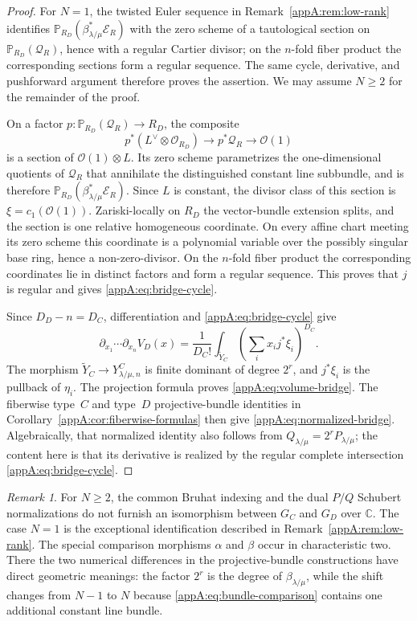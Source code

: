 \documentclass[11pt,a4paper,oneside]{amsart}
\numberwithin{equation}{section}
\theoremstyle{definition}
\theoremstyle{remark}
\newtheorem{remark}[theorem]{Remark}
\begin{document}
\begin{proof}
For $N=1$, the twisted Euler sequence in
Remark~\ref{appA:rem:low-rank} identifies
$\mathbb P_{R_D}(\beta_{\lambda/\mu}^*\mathcal E_R)$ with the zero scheme of
a tautological section on $\mathbb P_{R_D}(\mathcal Q_R)$, hence with a
regular Cartier divisor; on the $n$-fold fiber product the corresponding
sections form a regular sequence.  The same cycle,
derivative, and pushforward argument therefore proves the assertion.  We may
assume $N\geq2$ for the remainder of the proof.

On a factor $p:\mathbb P_{R_D}(\mathcal Q_R)\to R_D$, the composite
\[
  p^*(L^\vee\otimes\mathcal O_{R_D})
  \longrightarrow p^*\mathcal Q_R
  \longrightarrow\mathcal O(1)
\]
is a section of $\mathcal O(1)\otimes L$.  Its zero scheme parametrizes the
one-dimensional quotients of $\mathcal Q_R$ that annihilate the distinguished
constant line subbundle, and is therefore
$\mathbb P_{R_D}(\beta_{\lambda/\mu}^*\mathcal E_R)$.  Since $L$ is constant,
the divisor class of this section is $\xi=c_1(\mathcal O(1))$.  Zariski-locally
on $R_D$ the vector-bundle extension splits, and the section is one relative
homogeneous coordinate.  On every affine chart meeting its zero scheme this
coordinate is a polynomial variable over the possibly singular base ring,
hence a non-zero-divisor.  On the $n$-fold fiber product the corresponding
coordinates lie in distinct factors and form a regular sequence.  This proves
that $j$ is regular and gives \eqref{appA:eq:bridge-cycle}.

Since $D_D-n=D_C$, differentiation and
\eqref{appA:eq:bridge-cycle} give
\[
  \partial_{x_1}\cdots\partial_{x_n}V_D(x)
  =\frac{1}{D_C!}
   \int_{\widetilde Y_C}
   \left(\sum_i x_i j^*\xi_i\right)^{D_C}.
\]
The morphism $\widetilde Y_C\to Y^C_{\lambda/\mu,n}$ is finite dominant of
degree $2^r$, and $j^*\xi_i$ is the pullback of $\eta_i$.  The projection
formula proves \eqref{appA:eq:volume-bridge}.  The fiberwise type~$C$ and type~$D$ projective-bundle identities in
Corollary~\ref{appA:cor:fiberwise-formulas} then give
\eqref{appA:eq:normalized-bridge}.  Algebraically, that normalized identity
also follows from $Q_{\lambda/\mu}=2^rP_{\lambda/\mu}$; the content here is
that its derivative is realized by the regular complete intersection
\eqref{appA:eq:bridge-cycle}.
\end{proof}

\begin{remark}
For $N\geq2$, the common Bruhat indexing and the dual $P/Q$ Schubert
normalizations do not furnish an isomorphism between $G_C$ and $G_D$ over
$\mathbb C$.  The case $N=1$ is the exceptional identification described in
Remark~\ref{appA:rem:low-rank}.  The special comparison morphisms $\alpha$
and $\beta$ occur in characteristic two.  There the two numerical differences in the
projective-bundle constructions have direct geometric meanings: the factor
$2^r$ is the degree of $\beta_{\lambda/\mu}$, while the shift changes from
$N-1$ to $N$ because \eqref{appA:eq:bundle-comparison} contains one additional
constant line bundle.
\end{remark}
\end{document}
